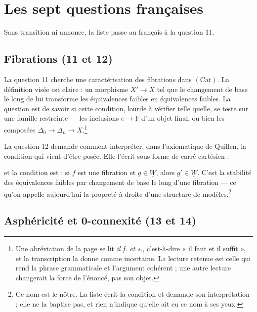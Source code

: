\documentclass[11pt,a4paper]{article}
\begin{document}
\section*{Les sept questions françaises}

Sans transition ni annonce, la liste passe au français à la question 11.

\subsection*{Fibrations (11 et 12)}

La question 11 cherche une caractérisation des fibrations dans
$(\mathrm{Cat})$. La définition visée est claire : un morphisme $X' \to X$ tel
que le changement de base le long de lui transforme les équivalences faibles en
équivalences faibles. La question est de savoir si cette condition, lourde à
vérifier telle quelle, se teste sur une famille restreinte --- les inclusions
$e \to Y$ d'un objet final, ou bien les composées $\Delta_{0} \to \Delta_{n}
\to X$.\footnote{Une abréviation de la page se lit \emph{il f. et s.}, c'est-à-dire
« il faut et il suffit », et la transcription la donne comme incertaine. La
lecture retenue est celle qui rend la phrase grammaticale et l'argument
cohérent ; une autre lecture changerait la force de l'énoncé, pas son objet.}

La question 12 demande comment interpréter, dans l'axiomatique de Quillen, la
condition qui vient d'être posée. Elle l'écrit sous forme de carré cartésien :


et la condition est : si $f$ est une fibration et $g \in \underline{W}$, alors
$g' \in \underline{W}$. C'est la stabilité des équivalences faibles par
changement de base le long d'une fibration --- ce qu'on appelle aujourd'hui la
propreté à droite d'une structure de modèles.\footnote{Ce nom est le nôtre. La
liste écrit la condition et demande son interprétation ; elle ne la baptise pas,
et rien n'indique qu'elle ait eu ce nom à ses yeux.}

\subsection*{Asphéricité et 0-connexité (13 et 14)}
\end{document}
